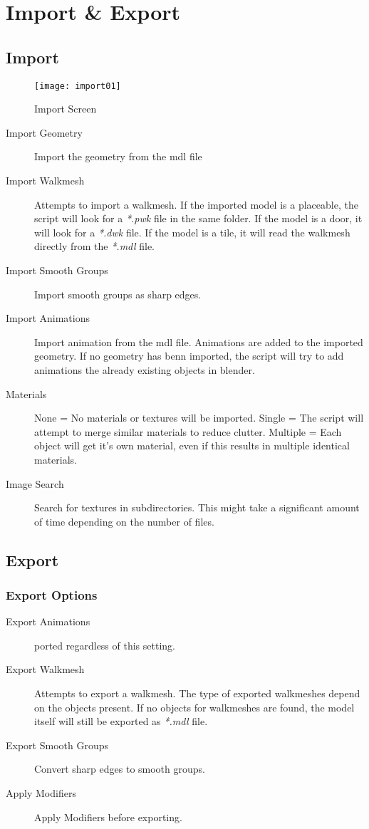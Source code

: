\section{Import \& Export}

\subsection{Import}

\begin{figure}
  \centering
  \texttt{[image: import01]}
  \caption[mdl import]{Import Screen}
  \label{fig:import01}
\end{figure}

\begin{description}
    \item[Import Geometry] Import the geometry from the mdl file
    \item[Import Walkmesh] Attempts to import a walkmesh. If the imported model is a placeable, the script will look for a {\textit{*.pwk}} file in the same folder. If the model is a door, it will look for a {\textit{*.dwk}} file. If the model is a tile, it will read the walkmesh directly from the {\textit{*.mdl}} file.
    \item[Import Smooth Groups] Import smooth groups as sharp edges.
    \item[Import Animations] Import animation from the mdl file. Animations are added to the imported geometry. If no geometry has benn imported, the script will try to add animations the already existing objects in blender.
    \item[Materials] None = No materials or textures will be imported. Single = The script will attempt to merge similar materials to reduce clutter. Multiple = Each object will get it's own material, even if this results in multiple identical materials.
    \item[Image Search] Search for textures in subdirectories. This might take a significant amount of time depending on the number of files.
\end{description}


\subsection{Export}

\subsubsection*{Export Options}
\begin{description}
    \item[Export Animations] ported regardless of this setting.
    \item[Export Walkmesh] Attempts to export a walkmesh. The type of exported walkmeshes depend on the objects present. If no objects for walkmeshes are found, the model itself will still be exported as {\textit{*.mdl }} file.
    \item[Export Smooth Groups] Convert sharp edges to smooth groups.
    \item[Apply Modifiers] Apply Modifiers before exporting.
\end{description}
